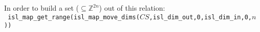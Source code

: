 \documentclass{article}
\begin{document}
In order to build a set ($\subseteq \mathbb{Z}^{2n}$) out of this relation: \\
{\tt
isl\_map\_get\_range(isl\_map\_move\_dims($CS$,isl\_dim\_out,0,isl\_dim\_in,0,$n$))}



% 
% 
% 
\end{document}
